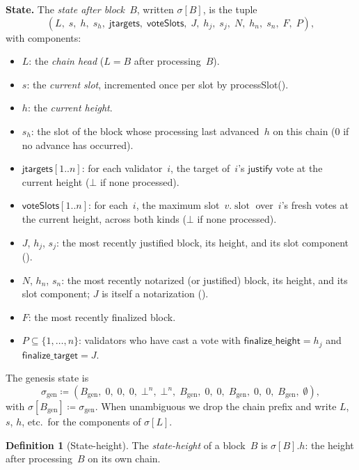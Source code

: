 \documentclass{article}
\newcommand{\genesis}{\ensuremath{B_{\mathrm{gen}}}}
\newcommand{\slot}[0]{\ensuremath{\operatorname{\mathrm{slot}}}}
\newcommand{\just}{\ensuremath{\mathsf{justify}}\xspace}
\newcommand{\finalizeHeight}{\mathsf{finalize\_height}}
\newcommand{\finalizeTarget}{\mathsf{finalize\_target}}
\newcommand{\jtargets}{\mathsf{jtargets}}
\newcommand{\voteSlots}{\mathsf{voteSlots}}
\newcommand{\processSlot}{\textsf{processSlot}\xspace}
\renewcommand{\paragraph}[1]{\vspace{7pt}\noindent\textbf{#1}}
\theoremstyle{plain}
\theoremstyle{definition}
\newtheorem{definition}[theorem]{Definition}
\theoremstyle{remark}
\begin{document}
\paragraph{State.}
The \emph{state after block~$B$}, written $\sigma[B]$, is the tuple
\[
  (L,\; s,\; h,\; s_h,\; \jtargets,\; \voteSlots,\; J,\; h_j,\; s_j,\; N,\; h_n,\; s_n,\; F,\; P),
\]
with components:
\begin{itemize}
  \item $L$: the \emph{chain head} ($L = B$ after processing~$B$).
  \item $s$: the \emph{current slot}, incremented once per slot by \processSlot ().
  \item $h$: the \emph{current height}.
  \item $s_h$: the slot of the block whose processing last advanced~$h$ on this chain ($0$ if no advance has occurred).
  \item $\jtargets[1..n]$: for each validator~$i$, the target of~$i$'s \just vote at the current height ($\bot$ if none processed).
  \item $\voteSlots[1..n]$: for each~$i$, the maximum slot~$v.\slot$ over~$i$'s fresh votes at the current height, across both kinds ($\bot$ if none processed).
  \item $J$, $h_j$, $s_j$: the most recently justified block, its height, and its slot component ().
  \item $N$, $h_n$, $s_n$: the most recently notarized (or justified) block, its height, and its slot component; $J$ is itself a notarization ().
  \item $F$: the most recently finalized block.
  \item $P \subseteq \{1, \ldots, n\}$: validators who have cast a vote with $\finalizeHeight = h_j$ and $\finalizeTarget = J$.
\end{itemize}
The genesis state is
\[
  \sigma_{\mathrm{gen}} \coloneqq (\genesis,\; 0,\; 0,\; 0,\; \bot^n,\; \bot^n,\; \genesis,\; 0,\; 0,\; \genesis,\; 0,\; 0,\; \genesis,\; \emptyset),
\]
with $\sigma[\genesis] \coloneqq \sigma_{\mathrm{gen}}$.
When unambiguous we drop the chain prefix and write $L$, $s$, $h$, etc.\ for the components of $\sigma[L]$.

\begin{definition}[State-height]\label{def:sheight}
The \emph{state-height} of a block~$B$ is $\sigma[B].h$: the height after processing~$B$ on its own chain.
\end{definition}
\end{document}
